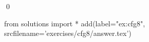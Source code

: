 
\begin{ex} 
  \label{ex:cfg8}
  
  \qed
\end{ex} 
\begin{python0}
from solutions import *
add(label="ex:cfg8",
    srcfilename='exercises/cfg8/answer.tex') 
\end{python0}
